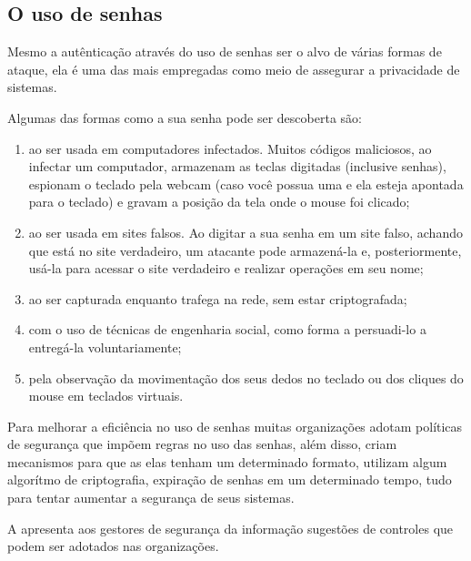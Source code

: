 \subsection{O uso de senhas}
Mesmo a autênticação através do uso de senhas ser o alvo de várias formas de ataque, ela é uma das mais empregadas como meio de assegurar a privacidade de sistemas.
\begin{citacao}
Algumas das formas como a sua senha pode ser descoberta são:
\begin{enumerate}
\item ao ser usada em computadores infectados. Muitos códigos maliciosos, ao infectar um computador, armazenam as teclas digitadas (inclusive senhas), espionam o teclado pela webcam (caso você possua uma e ela esteja apontada para o teclado) e gravam a posição da tela onde o mouse foi clicado;
\item ao ser usada em sites falsos. Ao digitar a sua senha em um site falso, achando que está no site verdadeiro, um atacante pode armazená-la e, posteriormente, usá-la para acessar o site verdadeiro e realizar operações em seu nome;
\item ao ser capturada enquanto trafega na rede, sem estar criptografada;
\item com o uso de técnicas de engenharia social, como forma a persuadi-lo a entregá-la voluntariamente;
\item pela observação da movimentação dos seus dedos no teclado ou dos cliques do mouse em teclados virtuais.
\cite{Cert2016}
\end{enumerate}
\end{citacao}

Para melhorar a eficiência no uso de senhas muitas organizações adotam políticas de segurança que impõem regras no uso das senhas, além disso, criam mecanismos para que as elas tenham um determinado formato, utilizam algum algorítmo de criptografia, expiração de senhas em um determinado tempo, tudo para tentar aumentar a segurança de seus sistemas.

A  apresenta aos gestores de segurança da informação sugestões de controles que podem ser adotados nas organizações.

